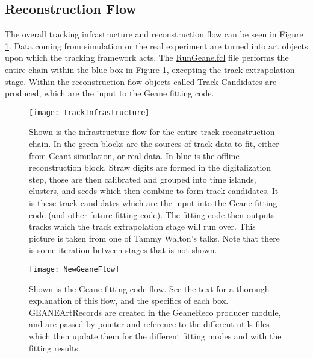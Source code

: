   \subsection{Reconstruction Flow}

    The overall tracking infrastructure and reconstruction flow can be seen in Figure \ref{fig:Infrastructure}. Data coming from simulation or the real experiment are turned into art objects upon which the tracking framework acts. The \hyperref[sec:RunGeane]{RunGeane.fcl} file performs the entire chain within the blue box in Figure \ref{fig:Infrastructure}, excepting the track extrapolation stage. Within the reconstruction flow objects called Track Candidates are produced, which are the input to the Geane fitting code.


\begin{figure}[]
\caption{Shown is the infrastructure flow for the entire track reconstruction chain. In the green blocks are the sources of track data to fit, either from Geant simulation, or real data. In blue is the offline reconstruction block. Straw digits are formed in the digitalization step, those are then calibrated and grouped into time islands, clusters, and seeds which then combine to form track candidates. It is these track candidates which are the input into the Geane fitting code (and other future fitting code). The fitting code then outputs tracks which the track extrapolation stage will run over. This picture is taken from one of Tammy Walton's talks. Note that there is some iteration between stages that is not shown.}
\centering
\texttt{[image: TrackInfrastructure]}
\label{fig:Infrastructure}
\end{figure}

\begin{figure}[]
\caption{Shown is the Geane fitting code flow. See the text for a thorough explanation of this flow, and the specifics of each box. GEANEArtRecords are created in the GeaneReco producer module, and are passed by pointer and reference to the different utils files which then update them for the different fitting modes and with the fitting results.}
\centering
\hspace{15mm}
\texttt{[image: NewGeaneFlow]}
\label{fig:NewGeaneFlow}
\end{figure}


